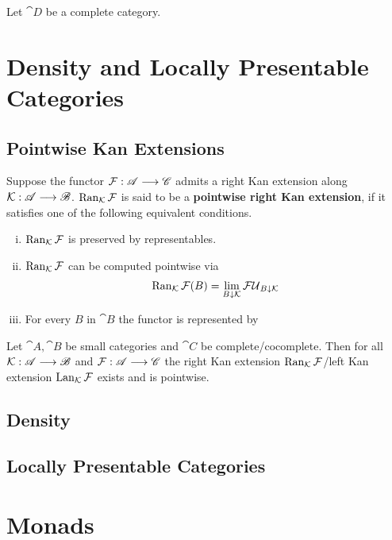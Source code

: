 	\begin{theorem}
		Let $\cat{D}$ be a complete category. 
	\end{theorem}

	\newpage
	\section{Density and Locally Presentable Categories}
	\subsection{Pointwise Kan Extensions}

	\begin{definition}
		Suppose the functor $\mathcal{F}:\mathscr{A} --> \mathscr{C}$ admits a right Kan extension along $\mathcal{K}:\mathscr{A} --> \mathscr{B}$. $\operatorname{Ran}_{\mathcal{K}}\mathcal{F}$ is said to be a \textbf{pointwise right Kan extension}, if it satisfies one of the following equivalent conditions.
		\begin{enumerate}[(i)]
			\item{
				$\operatorname{Ran}_{\mathcal{K}}\mathcal{F}$ is preserved by representables.
			}
			\item{
				$\operatorname{Ran}_{\mathcal{K}}\mathcal{F}$ can be computed pointwise via
				\begin{align*}
					\operatorname{Ran}_{\mathcal{K}}\mathcal{F}(B) = \lim_{B \downarrow \mathcal{K}} \mathcal{FU}_{B \downarrow \mathcal{K}}
				\end{align*}
			}
			\item{
				For every $B$ in $\cat{B}$ the functor  is represented by 
			}
		\end{enumerate}
	\end{definition}

	\begin{lemma}
		Let $\cat{A},\cat{B}$ be small categories and $\cat{C}$ be complete/cocomplete. Then for all $\mathcal{K}:\mathscr{A} --> \mathscr{B}$ and $\mathcal{F}:\mathscr{A}-->\mathscr{C}$ the right Kan extension $\operatorname{Ran}_{\mathcal{K}}\mathcal{F}$/left Kan extension $\operatorname{Lan}_{\mathcal{K}}\mathcal{F}$ exists and is pointwise.
	\end{lemma}

	\subsection{Density}

	\subsection{Locally Presentable Categories}

	\newpage
	\section{Monads}
